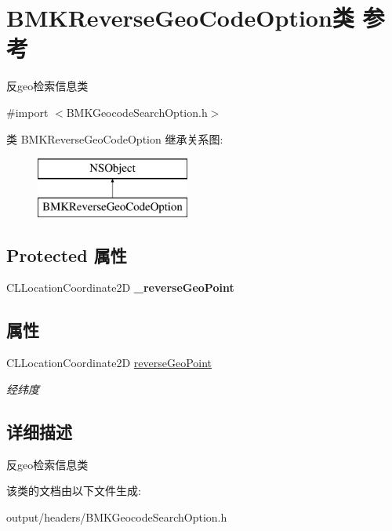 \hypertarget{interface_b_m_k_reverse_geo_code_option}{}\section{B\+M\+K\+Reverse\+Geo\+Code\+Option类 参考}
\label{interface_b_m_k_reverse_geo_code_option}


反geo检索信息类  




{\ttfamily \#import $<$B\+M\+K\+Geocode\+Search\+Option.\+h$>$}

类 B\+M\+K\+Reverse\+Geo\+Code\+Option 继承关系图\+:\begin{figure}[H]
\begin{center}
\leavevmode
\includegraphics[height=2.000000cm]{interface_b_m_k_reverse_geo_code_option}
\end{center}
\end{figure}
\subsection*{Protected 属性}
\begin{DoxyCompactItemize}
\item 
\hypertarget{interface_b_m_k_reverse_geo_code_option_aa133954248beab4577dfab30a851741a}{}C\+L\+Location\+Coordinate2\+D {\bfseries \+\_\+reverse\+Geo\+Point}\label{interface_b_m_k_reverse_geo_code_option_aa133954248beab4577dfab30a851741a}

\end{DoxyCompactItemize}
\subsection*{属性}
\begin{DoxyCompactItemize}
\item 
\hypertarget{interface_b_m_k_reverse_geo_code_option_aaa7bef4496d51b86817745915fe5478e}{}C\+L\+Location\+Coordinate2\+D \hyperlink{interface_b_m_k_reverse_geo_code_option_aaa7bef4496d51b86817745915fe5478e}{reverse\+Geo\+Point}\label{interface_b_m_k_reverse_geo_code_option_aaa7bef4496d51b86817745915fe5478e}

\begin{DoxyCompactList}\small\item\em 经纬度 \end{DoxyCompactList}\end{DoxyCompactItemize}


\subsection{详细描述}
反geo检索信息类 

该类的文档由以下文件生成\+:\begin{DoxyCompactItemize}
\item 
output/headers/B\+M\+K\+Geocode\+Search\+Option.\+h\end{DoxyCompactItemize}
